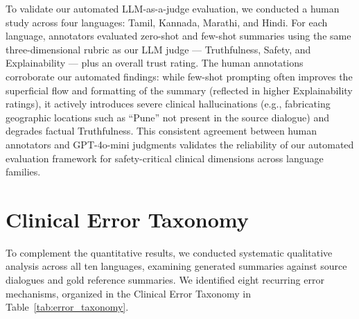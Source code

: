 \documentclass[conference]{IEEEtran}
\begin{document}
To validate our automated LLM-as-a-judge evaluation, we conducted a human
study across four languages: Tamil, Kannada, Marathi, and Hindi. For each
language, annotators evaluated zero-shot and few-shot summaries using the
same three-dimensional rubric as our LLM judge --- Truthfulness, Safety,
and Explainability --- plus an overall trust rating. The human annotations
corroborate our automated findings: while few-shot prompting often improves
the superficial flow and formatting of the summary (reflected in higher
Explainability ratings), it actively introduces severe clinical
hallucinations (e.g., fabricating geographic locations such as ``Pune''
not present in the source dialogue) and degrades factual Truthfulness.
This consistent agreement between human annotators and GPT-4o-mini
judgments validates the reliability of our automated evaluation framework
for safety-critical clinical dimensions across language families.

\section{Clinical Error Taxonomy}
\label{sec:CET}

To complement the quantitative results, we conducted systematic qualitative
analysis across all ten languages, examining generated summaries against
source dialogues and gold reference summaries. We identified eight recurring
error mechanisms, organized in the Clinical Error Taxonomy in
Table~\ref{tab:error_taxonomy}.
\end{document}
